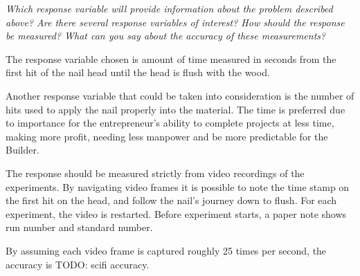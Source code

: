\textit{ Which response variable will provide information about the problem described above?
Are there several response variables of interest?
How should the response be measured?
What can you say about the accuracy of these measurements?}

The response variable chosen is amount of time measured in seconds from the first hit of the nail head until the head is flush with the wood. 

Another response variable that could be taken into consideration is the number of hits used to apply the nail properly into the material. The time is preferred due to importance for the entrepreneur's ability to complete projects at less time, making more profit, needing less manpower and be more predictable for the Builder.

The response should be measured strictly from video recordings of the experiments. By navigating video frames it is possible to note the time stamp on the first hit on the head, and follow the nail's journey down to flush. For each experiment, the video is restarted. Before experiment starts, a paper note shows run number and standard number.

By assuming each video frame is captured roughly 25 times per second, the accuracy is TODO: scifi accuracy.